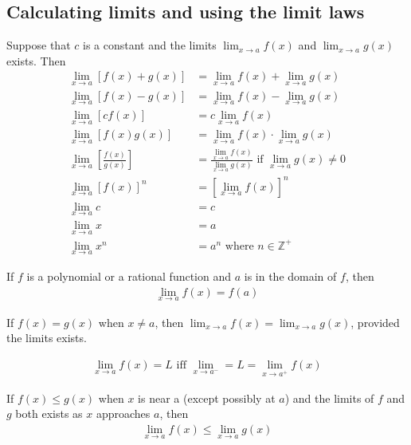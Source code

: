 \documentclass{article}
\begin{document}
\subsection{Calculating limits and using the limit laws}
\begin{theorem}
    Suppose that $c$ is a constant and the limits $\lim_{x\to a}f(x)$ and $\lim_{x\to a}g(x)$ exists. Then
    \begin{align*}
        \lim_{x\to a}\left[f(x)+g(x)\right]
        &=\lim_{x\to a}f(x)+\lim_{x\to a}g(x)\\
        \lim_{x\to a}\left[f(x)-g(x)\right]
        &=\lim_{x\to a}f(x)-\lim_{x\to a}g(x)\\
        \lim_{x\to a}\left[cf(x)\right]
        &=c\lim_{x\to a}f(x)\\
        \lim_{x\to a}\left[f(x)g(x)\right]
        &=\lim_{x\to a}f(x)\cdot\lim_{x\to a}g(x)\\
        \lim_{x\to a}\left[\frac{f(x)}{g(x)}\right]
        &=\frac{\lim_{x\to a}f(x)}{\lim_{x\to a}g(x)}\text{ if } \lim_{x\to a}g(x)\not = 0\\
        \lim_{x\to a}\left[f(x)\right]^n
        &=\left[\lim_{x\to a}f(x)\right]^n\\
        \lim_{x\to a}c &= c\\
        \lim_{x \to a}x &= a\\
        \lim_{x \to a}x^n &= a^n \text{ where } n\in\mathbb{Z}^+
    \end{align*}
\end{theorem}
\begin{theorem}
    If $f$ is a polynomial or a rational function and $a$ is in the domain of $f$, then
    \begin{align*}
        \lim_{x\to a}f(x) = f(a)
    \end{align*}
\end{theorem}
\begin{theorem}
    If $f(x) = g(x)$ when $x\not=a$, then $\lim_{x\to a}f(x) = \lim_{x\to a}g(x)$, provided the limits exists.
\end{theorem}
\begin{theorem}
    \begin{align*}
        \lim_{x\to a} f(x) = L\text{ iff } \lim_{x\to a^-}=L=\lim_{x\to a^+} f(x)
    \end{align*}
\end{theorem}
\begin{theorem}
    If $f(x) \leq g(x)$ when $x$ is near a (except possibly at $a$) and the limits of $f$ and $g$ both exists as $x$ approaches $a$, then
    \begin{align*}
        \lim_{x\to a}f(x) \leq \lim_{x\to a} g(x)
    \end{align*}
\end{theorem}
\end{document}
